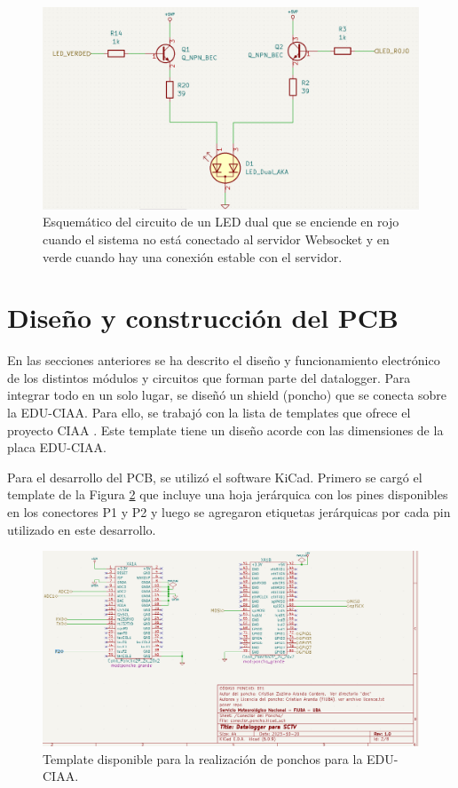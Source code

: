 \begin{figure}[H]
    \centering
    \includegraphics[width=0.95\linewidth]{Figuras/datalogger/Hardware/esquemLedStatusSocket.png}
    \caption{Esquemático del circuito de un LED dual que se enciende en rojo cuando el sistema no está conectado al servidor Websocket y en verde cuando hay una conexión estable con el servidor.}
    \label{fig:esquemLedStatusSocket}
\end{figure}



\section{Diseño y construcción del PCB}

En las secciones anteriores se ha descrito el diseño y funcionamiento electrónico de los distintos módulos y circuitos que forman parte del datalogger. Para integrar todo en un solo lugar, se diseñó un shield (poncho) que se conecta sobre la EDU-CIAA. Para ello, se trabajó con la lista de templates que ofrece el proyecto CIAA \cite{CIAA_Ponchos}. Este template tiene un diseño acorde con las dimensiones de la placa EDU-CIAA.

Para el desarrollo del PCB, se utilizó el software KiCad. Primero se cargó el template de la Figura \ref{fig:HojaTemplatePonchoCiaa} que incluye una hoja jerárquica con los pines disponibles en los conectores P1 y P2 y luego se agregaron etiquetas jerárquicas por cada pin utilizado en este desarrollo.

\begin{figure}[H]
    \centering
    \includegraphics[width=0.95\linewidth]{Figuras/datalogger/Hardware/HojaTemplatePonchoCiaa.png}
    \caption{Template disponible para la realización de ponchos para la EDU-CIAA.}
    \label{fig:HojaTemplatePonchoCiaa}
\end{figure}


